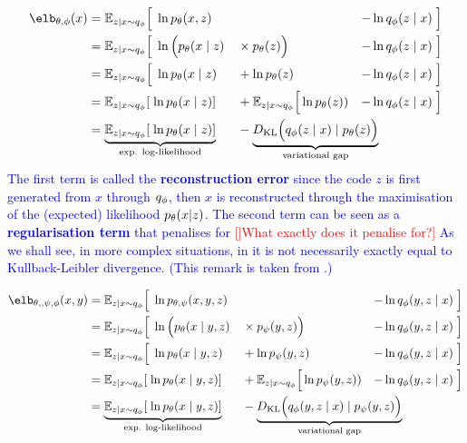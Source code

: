 \documentclass{article}
\begin{document}
\begin{appendix}
\textcolor{blue}{
\begin{align*}
\elb_{\theta, \phi}(x)
& = \esp_{z|x\sim q_\phi} \Big[ \; \ln \pt(x, z) && & -\ln \qp(z \mid x)  \; \Big] \\
& = \esp_{z|x\sim q_\phi} \Big[ \; \ln \Big(  \pt(x \mid z) && \times \pt (z) \Big) & -\ln \qp(z \mid x)  \; \Big] \\
& = \esp_{z|x \sim q_\phi} \Big[ \; \ln  \pt(x \mid z) && + \ln \pt (z) & -\ln \qp(z \mid x)  \; \Big] \\
& = \esp_{z|x \sim q_\phi} [ \; \ln  \pt(x \mid z) ] && + \esp_{z|x \sim q_\phi} \Big[ \ln \pt (z) ) & - \ln \qp(z \mid x)  \; \Big] \\
& = \underbrace{
    \esp_{z|x \sim q_\phi} [ \; \ln  \pt(x \mid z) ]
}_{
    \text{exp. log-likelihood}
}
&& - \mathrlap{ \underbrace{
     \KL \Big(\qp(z \mid x) \mid \pt(z) \Big)
}_{
    \text{variational gap}
} }
\end{align*}
The first term is called the \textbf{reconstruction error} since the code $z$ is first generated from $x$ through $q_\phi$, then $x$ is reconstructed through the maximisation of the (expected) likelihood $p_\theta(x|z)$. The second term can be seen as a \textbf{regularisation term} that penalises for \textcolor{red}{[]What exactly does it penalise for?]} As we shall see, in more complex situations, in it is not necessarily exactly equal to Kullback-Leibler divergence. (This remark is taken from \cite{deepgen}.)
}



\begin{align*}
\elb_{\theta, , \psi, \phi}(x, y)
& = \esp_{z|x\sim q_\phi} \Big[ \; \ln \ptp(x, y, z) && & -\ln \qp(y, z \mid x)  \; \Big] \\
& = \esp_{z|x\sim q_\phi} \Big[ \; \ln \Big(  \pt(x \mid y, z) && \times \pp (y, z) \Big) & -\ln \qp(y, z \mid x)  \; \Big] \\
& = \esp_{z|x \sim q_\phi} \Big[ \; \ln  \pt(x \mid y, z) && + \ln \pp (y, z) & -\ln \qp(y, z \mid x)  \; \Big] \\
& = \esp_{z|x \sim q_\phi} [ \; \ln  \pt(x \mid y, z) ] && + \esp_{z|x \sim q_\phi} \Big[ \ln \pp (y, z) ) & - \ln \qp(y, z \mid x)  \; \Big] \\
& = \underbrace{
    \esp_{z|x \sim q_\phi} [ \; \ln  \pt(x \mid y, z) ]
}_{
    \text{exp. log-likelihood}
}
&& - \mathrlap{ \underbrace{
     \KL \Big(\qp(y, z \mid x) \mid \pp(y, z) \Big)
}_{
    \text{variational gap}
} }
\end{align*}


\end{appendix}
\end{document}
